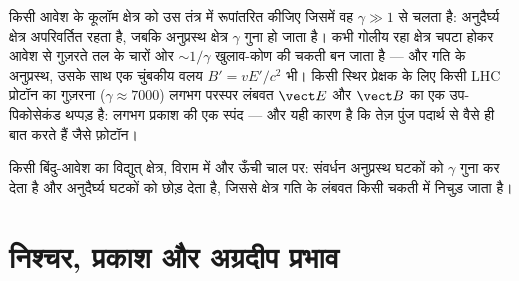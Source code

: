 \begin{example}[तेज़ आवेश का चपटा क्षेत्र]\label{ex:b3:covariant-electromagnetism:pancake}
किसी आवेश के कूलॉम क्षेत्र को उस तंत्र में रूपांतरित कीजिए जिसमें वह
$\gamma \gg 1$ से चलता है: अनुदैर्घ्य क्षेत्र अपरिवर्तित रहता है, जबकि
अनुप्रस्थ क्षेत्र $\gamma$ गुना हो जाता है। कभी गोलीय रहा क्षेत्र
चपटा होकर आवेश से गुज़रते तल के चारों ओर $\sim 1/\gamma$ खुलाव-कोण की
चकती बन जाता है --- और गति के अनुप्रस्थ, उसके साथ एक चुंबकीय वलय
$B' = vE'/c^2$ भी। किसी स्थिर प्रेक्षक के लिए किसी LHC प्रोटॉन का
गुज़रना ($\gamma \approx 7000$) लगभग परस्पर लंबवत $\vect E$ और
$\vect B$ का एक उप-पिकोसेकंड थप्पड़ है: लगभग प्रकाश की एक स्पंद ---
और यही कारण है कि तेज़ पुंज पदार्थ से वैसे ही बात करते हैं जैसे फ़ोटॉन।
\end{example}

\begin{omfigure}

{\small किसी बिंदु-आवेश का विद्युत् क्षेत्र, विराम में और ऊँची
चाल पर: संवर्धन अनुप्रस्थ घटकों को $\gamma$ गुना कर देता है और
अनुदैर्घ्य घटकों को छोड़ देता है, जिससे क्षेत्र गति के लंबवत किसी चकती
में निचुड़ जाता है।}
\end{omfigure}

\section{निश्चर, प्रकाश और अग्रदीप प्रभाव}

